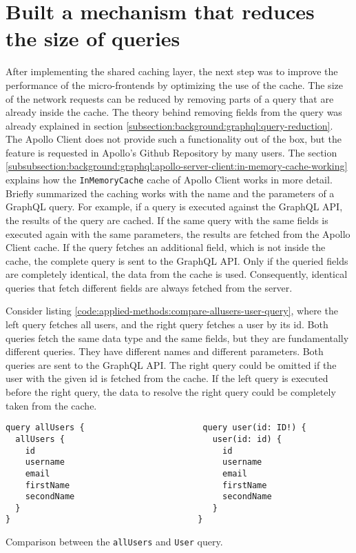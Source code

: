 \section{Built a mechanism that reduces the size of queries}\label{section:applied-methods:query-reduction}

After implementing the shared caching layer, the next step was to improve the performance of the micro-frontends by optimizing the use of the cache. The size of the network requests can be reduced by removing parts of a query that are already inside the cache. The theory behind removing fields from the query was already explained in section \ref{subsection:background:graphql:query-reduction}. The Apollo Client does not provide such a functionality out of the box, but the feature is requested in Apollo's Github Repository by many users. The section \ref{subsubsection:background:graphql:apollo-server-client:in-memory-cache-working} explains how the \texttt{InMemoryCache} cache of Apollo Client works in more detail. Briefly summarized the caching works with the name and the parameters of a GraphQL query. For example, if a query is executed against the GraphQL \ac{API}, the results of the query are cached. If the same query with the same fields is executed again with the same parameters, the results are fetched from the Apollo Client cache. If the query fetches an additional field, which is not inside the cache, the complete query is sent to the GraphQL \ac{API}. Only if the queried fields are completely identical, the data from the cache is used. Consequently, identical queries that fetch different fields are always fetched from the server.

\bigskip

\noindent Consider listing \ref{code:applied-methods:compare-allusers-user-query}, where the left query fetches all users, and the right query fetches a user by its id. Both queries fetch the same data type and the same fields, but they are fundamentally different queries. They have different names and different parameters. Both queries are sent to the GraphQL \ac{API}. The right query could be omitted if the user with the given id is fetched from the cache. If the left query is executed before the right query, the data to resolve the right query could be completely taken from the cache.

\ifshowListings
\begin{listing}[H]
\begin{verbatim}
query allUsers {                        query user(id: ID!) {
  allUsers {                              user(id: id) {
    id                                      id
    username                                username
    email                                   email
    firstName                               firstName
    secondName                              secondName
  }                                       }
}                                      }
\end{verbatim}
\caption{Comparison between the \texttt{allUsers} and \texttt{User} query.}\label{code:applied-methods:compare-allusers-user-query}
\end{listing}
\fi

